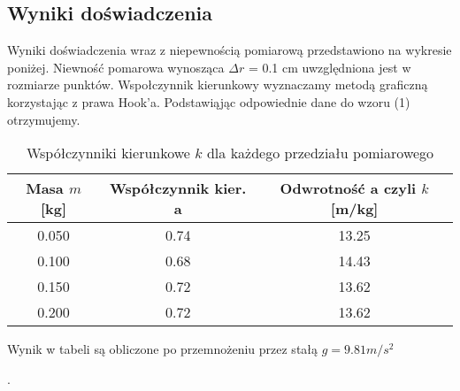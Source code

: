\documentclass{article} %
\begin{document}
\subsection{Wyniki doświadczenia}
Wyniki doświadczenia wraz z niepewnością pomiarową przedstawiono na wykresie poniżej. Niewność pomarowa wynosząca $\Delta r$ = 0.1 cm uwzględniona jest w rozmiarze punktów. Wspołczynnik kierunkowy wyznaczamy metodą graficzną korzystając z prawa Hook'a. Podstawiąjąc odpowiednie dane do wzoru (1) otrzymujemy.
{
\begin{center}



\begin{table}[h!]
\centering

\label{tab:coefficients}

\begin{tabular}{|c|c|c|}
\hline
\textbf{Masa \( m \) [kg]} & \textbf{Współczynnik kier. a} & \textbf{Odwrotność a czyli \( k \) [m/kg]} \\ 
\hline
0.050 & 0.74 & 13.25 \\ 
0.100 & 0.68 & 14.43 \\ 
0.150 & 0.72 & 13.62 \\ 
0.200 & 0.72 & 13.62 \\
\hline
\end{tabular}
\caption{Współczynniki kierunkowe \( k \) dla każdego przedziału pomiarowego}
\end{table}
\end{center}
Wynik w tabeli są obliczone po przemnożeniu przez stałą $g = 9.81m/s^2$}.
\end{document}
